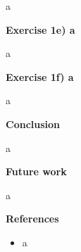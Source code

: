 \documentclass[12pt,a4paper]{article}
\begin{document}
\noindent a

\newpage

\begin{center}
\Large{\textbf{Exercise 1e) a}}
\end{center}

\noindent a

\newpage

\begin{center}
\Large{\textbf{Exercise 1f) a}}
\end{center}

\noindent a

\newpage

\begin{center}
\Large{\textbf{Conclusion}}
\end{center}

\noindent a

\newpage

\begin{center}
\Large{\textbf{Future work}}
\end{center}

\noindent a

\newpage

\begin{center}
\Large{\textbf{References}}
\end{center}

\begin{itemize}
  \item a
\end{itemize}
\end{document}
